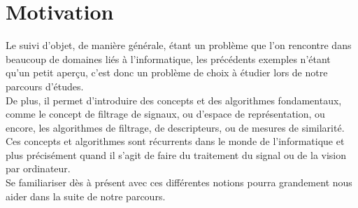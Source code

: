 \section{Motivation}
Le suivi d'objet, de manière générale, étant un problème que l'on rencontre dans beaucoup de domaines liés à l'informatique, les précédents exemples n'étant qu'un petit aperçu, c'est donc un problème de choix à étudier lors de notre parcours d'études.\\
De plus, il permet d'introduire des concepts et des algorithmes fondamentaux, comme le concept de filtrage de signaux, ou d'espace de représentation, ou encore, les algorithmes de filtrage, de descripteurs, ou de mesures de similarité.\\
Ces concepts et algorithmes sont récurrents dans le monde de l'informatique et plus précisément quand il s'agit de faire du traitement du signal ou de la vision par ordinateur.\\
Se familiariser dès à présent avec ces différentes notions pourra grandement nous aider dans la suite de notre parcours.\\




